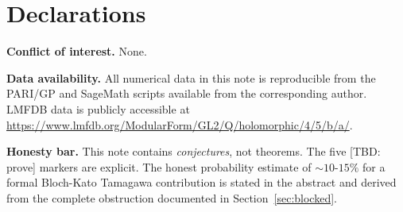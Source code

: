 \documentclass[12pt]{amsart}
\theoremstyle{definition}
\begin{document}
\section*{Declarations}

\noindent\textbf{Conflict of interest.} None.

\noindent\textbf{Data availability.} All numerical data in this note
is reproducible from the PARI/GP and SageMath scripts available from
the corresponding author. LMFDB data is publicly accessible at
\url{https://www.lmfdb.org/ModularForm/GL2/Q/holomorphic/4/5/b/a/}.

\noindent\textbf{Honesty bar.} This note contains \emph{conjectures},
not theorems. The five [TBD: prove] markers are explicit.
The honest probability estimate of $\sim 10$-$15\%$ for a formal
Bloch-Kato Tamagawa contribution is stated in the abstract
and derived from the complete obstruction documented in Section~\ref{sec:blocked}.
\end{document}
